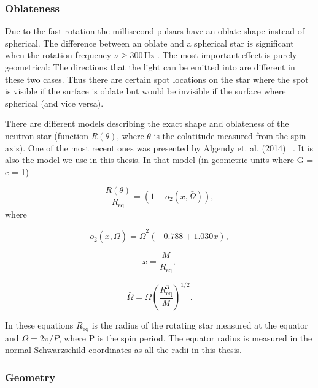 \documentclass{wihuri}
\begin{document}
\subsubsection{Oblateness}

Due to the fast rotation the millisecond pulsars have an oblate shape instead of spherical. The difference between an oblate and a spherical star is significant when the rotation frequency $\nu \ge 300 \, \mathrm{Hz}$ %
. The most important effect is purely geometrical: The directions that the light can be emitted into are different in these two cases. Thus there are certain spot locations on the star where the spot is visible if the surface is oblate but would be invisible if the surface where spherical (and vice versa).


There are different models describing the exact shape and oblateness of the neutron star (function $R(\theta)$, where $\theta$ is the colatitude measured from the spin axis).
One of the most recent ones was presented by Algendy et. al. (2014) ~\cite{algendy}. 
It is also the model we use in this thesis. In that model (in geometric units
where G = c = 1)

\begin{equation}
\label{rtheta2}
\frac{R(\theta)}{R_{\mathrm{eq}}} = (1 + o_{2}(x,\bar{\Omega})),
\end{equation}
where


\begin{equation}
\label{otwo}
o_{2}(x,\bar{\Omega}) = \bar{\Omega}^{2}(-0.788+1.030x),
\end{equation}


\begin{equation}
\label{rtheta2x}
x = \frac{M}{R_{\mathrm{eq}}},
\end{equation}


\begin{equation}
\label{rtheta2omega}
\bar{\Omega} = \Omega (\frac{R_{\mathrm{eq}}^{3}}{M})^{1/2}.
\end{equation}


In these equations $R_{\mathrm{eq}}$ is the radius of the rotating star measured at the equator and $\Omega = 2\pi/P$, where P is the spin period. The equator radius is measured in the normal Schwarzschild coordinates as all the radii in this thesis.


\subsubsection{Geometry}
\end{document}
